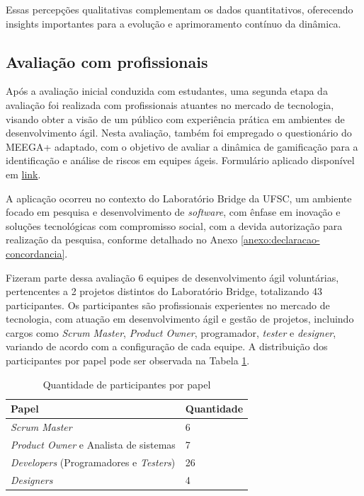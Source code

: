 \documentclass[
	12pt,
	openright,
	twoside,
	a4paper,
	english,
	brazil
	]{abntex2}
\begin{document}
Essas percepções qualitativas complementam os dados quantitativos, oferecendo insights importantes para a evolução e aprimoramento contínuo da dinâmica.

\subsection{Avaliação com profissionais}

Após a avaliação inicial conduzida com estudantes, uma segunda etapa da avaliação foi realizada com profissionais atuantes no mercado de tecnologia, visando obter a visão de um público com experiência prática em ambientes de desenvolvimento ágil. Nesta avaliação, também foi empregado o questionário do MEEGA+ adaptado, com o objetivo de avaliar a dinâmica de gamificação para a identificação e análise de riscos em equipes ágeis. Formulário aplicado disponível em \href{https://docs.google.com/forms/d/e/1FAIpQLSeNTDwQlXD0WkbHFctGwSt_GMDTmnQL_ZOyxNWOXUk4hJfUCA/viewform?usp=dialog}{link}.

A aplicação ocorreu no contexto do Laboratório Bridge da UFSC, um ambiente focado em pesquisa e desenvolvimento de \textit{software}, com ênfase em inovação e soluções tecnológicas com compromisso social, com a devida autorização para realização da pesquisa, conforme detalhado no Anexo \ref{anexo:declaracao-concordancia}.

Fizeram parte dessa avaliação 6 equipes de desenvolvimento ágil voluntárias, pertencentes a 2 projetos distintos do Laboratório Bridge, totalizando 43 participantes. Os participantes são profissionais experientes no mercado de tecnologia, com atuação em desenvolvimento ágil e gestão de projetos, incluindo cargos como \textit{Scrum Master}, \textit{Product Owner}, programador, \textit{tester} e \textit{designer}, variando de acordo com a configuração de cada equipe. A distribuição dos participantes por papel pode ser observada na Tabela \ref{tab:participantes-papel}.

\begin{table}[H]
  \centering
  \caption{\label{tab:participantes-papel} Quantidade de participantes por papel}
  \begin{tabular}{|p{7cm}|p{2.5cm}|}
    \hline
    \textbf{Papel} & \textbf{Quantidade} \\
    \hline
    \textit{Scrum Master} & 6 \\
    \hline
    \textit{Product Owner} e Analista de sistemas & 7 \\
    \hline
    \textit{Developers} (Programadores e \textit{Testers}) & 26 \\
    \hline
    \textit{Designers} & 4 \\
    \hline
  \end{tabular}
\end{table}
\end{document}
